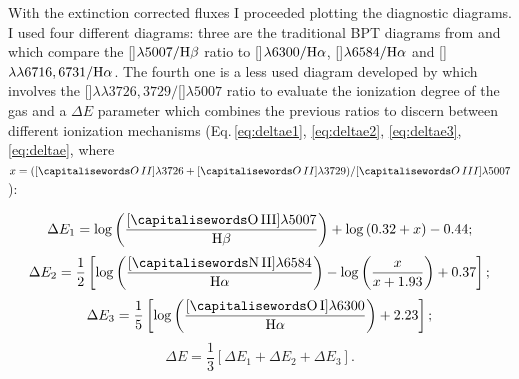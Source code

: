 \documentclass[../main.tex]{subfiles}
\begin{document}
With the extinction corrected fluxes I proceeded plotting the diagnostic diagrams.
I used four different diagrams: three are the traditional BPT diagrams from \citet{Baldwin81} and \citet{Veilleux87} which compare the []$\lambda5007/\rm H\beta$ ratio to []$\lambda6300/\rm H\alpha$, []$\lambda6584/\rm H\alpha$ and []$\lambda\lambda6716,6731/\rm H\alpha$.
The fourth one is a less used diagram developed by \citet{Baldwin81} which involves the []$\lambda\lambda3726,3729/$[]$\lambda5007$ ratio to evaluate the ionization degree of the gas and a $\Delta E$ parameter which combines the previous ratios to discern between different ionization mechanisms (Eq.\,\ref{eq:deltae1}, \ref{eq:deltae2}, \ref{eq:deltae3}, \ref{eq:deltae}, where $x=([\ion{O}{II}]\lambda3726+[\ion{O}{II}]\lambda3729)/[\ion{O}{III}]\lambda5007$):


\begin{equation}
\label{eq:deltae1}
\Delta E_1=\log\left(\frac{\rm[\ion{O}{III}]\lambda5007}{\rm \Hb}\right)+\log\left(0.32+x\right)-0.44;
\end{equation}
\begin{equation}
\label{eq:deltae2}
\Delta E_2= \frac{1}{2}\left[\log\left(\frac{\rm[\ion{N}{II}]\lambda6584}{\rm \Ha}\right)-\log\left(\frac{x}{x+1.93}\right) + 0.37\right];
\end{equation}
\begin{equation}
\label{eq:deltae3}
\Delta E_3=\frac{1}{5}\left[\log\left(\frac{\rm  [\ion{O}{I}]\lambda6300}{\rm \Ha}\right)+2.23\right];
\end{equation}
\begin{equation}
\label{eq:deltae}
\Delta E=\frac{1}{3}\left[\Delta E_1+\Delta E_2+\Delta E_3 \right].
\end{equation}
\end{document}
